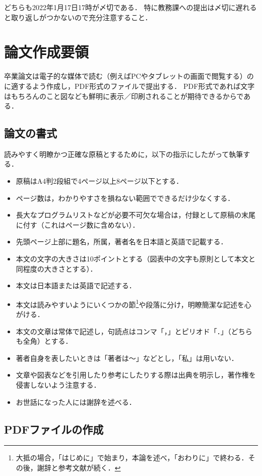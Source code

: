 \documentclass[a4paper,twocolumn,10pt]{ltjsarticle}
\begin{document}
どちらも2022年1月17日17時が〆切である．
特に教務課への提出は〆切に遅れると取り返しがつかないので充分注意すること．

\section{論文作成要領}

卒業論文は電子的な媒体で読む（例えばPCやタブレットの画面で閲覧する）のに適するよう作成し，PDF形式のファイルで提出する．
PDF形式であれば文字はもちろんのこと図なども鮮明に表示／印刷されることが期待できるからである．

\subsection{論文の書式}

読みやすく明瞭かつ正確な原稿とするために，以下の指示にしたがって執筆する．

\begin{itemize}
 \item 原稿はA4判2段組で4ページ以上8ページ以下とする．
 \item ページ数は，わかりやすさを損ねない範囲でできるだけ少なくする．
 \item 長大なプログラムリストなどが必要不可欠な場合は，付録として原稿の末尾に付す（これはページ数に含めない）．
 \item 先頭ページ上部に題名，所属，著者名を日本語と英語で記載する．
 \item 本文の文字の大きさは10ポイントとする（図表中の文字も原則として本文と同程度の大きさとする）．
 \item 本文は日本語または英語で記述する．
 \item 本文は読みやすいようにいくつかの節\footnote{大抵の場合，「はじめに」で始まり，本論を述べ，「おわりに」で終わる．その後，謝辞と参考文献が続く．}や段落に分け，明瞭簡潔な記述を心がける．
 \item 本文の文章は常体で記述し，句読点はコンマ「，」とピリオド「．」（どちらも全角）とする．
 \item 著者自身を表したいときは「著者は〜」などとし，「私」は用いない．
 \item 文章や図表などを引用したり参考にしたりする際は出典を明示し，著作権を侵害しないよう注意する．
 \item お世話になった人には謝辞を述べる．
\end{itemize}

\subsection{PDFファイルの作成}
\end{document}
